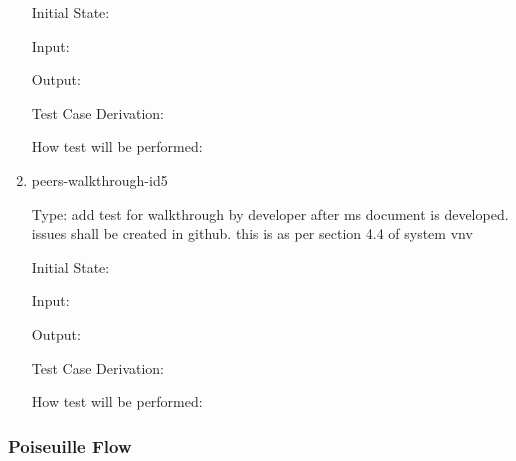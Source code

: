 \documentclass[12pt, titlepage]{article}
\begin{document}
\begin{enumerate}
Initial State: 
					
Input: 
					
Output: 

Test Case Derivation:

How test will be performed: 

\item{peers-walkthrough-id5\\}

Type: add test for walkthrough by developer after ms document is developed. issues shall be created in github. this is as per section 4.4 of system vnv
					
Initial State: 
					
Input: 
					
Output: 

Test Case Derivation:

How test will be performed: 

\end{enumerate}    

\subsubsection{Poiseuille Flow}

\end{document}
